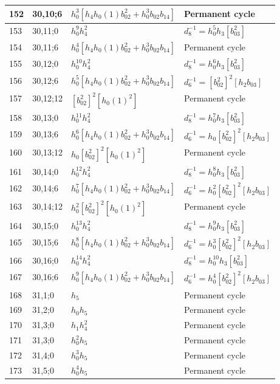 \documentclass{article}
\begin{document}
\begin{longtable}{|l|l|>{\raggedright\arraybackslash}p{6cm}|>{\raggedright\arraybackslash}p{6cm}|}
\hline
152 & 30,10;6 & $h_0^3[h_4h_0(1)b_{02}^2 + h_0^3b_{02}b_{14}]$ & Permanent cycle\\
\hline
153 & 30,11;0 & $h_0^9h_4^2$ & $d_{8}^{-1}=h_0^5h_3[b_{03}^2]$\\
\hline
154 & 30,11;6 & $h_0^4[h_4h_0(1)b_{02}^2 + h_0^3b_{02}b_{14}]$ & Permanent cycle\\
\hline
155 & 30,12;0 & $h_0^{10}h_4^2$ & $d_{8}^{-1}=h_0^6h_3[b_{03}^2]$\\
\hline
156 & 30,12;6 & $h_0^5[h_4h_0(1)b_{02}^2 + h_0^3b_{02}b_{14}]$ & $d_{6}^{-1}=[b_{02}^2]^2[h_2b_{03}]$\\
\hline
157 & 30,12;12 & $[b_{02}^2]^2[h_0(1)^2]$ & Permanent cycle\\
\hline
158 & 30,13;0 & $h_0^{11}h_4^2$ & $d_{8}^{-1}=h_0^7h_3[b_{03}^2]$\\
\hline
159 & 30,13;6 & $h_0^6[h_4h_0(1)b_{02}^2 + h_0^3b_{02}b_{14}]$ & $d_{6}^{-1}=h_0[b_{02}^2]^2[h_2b_{03}]$\\
\hline
160 & 30,13;12 & $h_0[b_{02}^2]^2[h_0(1)^2]$ & Permanent cycle\\
\hline
161 & 30,14;0 & $h_0^{12}h_4^2$ & $d_{8}^{-1}=h_0^8h_3[b_{03}^2]$\\
\hline
162 & 30,14;6 & $h_0^7[h_4h_0(1)b_{02}^2 + h_0^3b_{02}b_{14}]$ & $d_{6}^{-1}=h_0^2[b_{02}^2]^2[h_2b_{03}]$\\
\hline
163 & 30,14;12 & $h_0^2[b_{02}^2]^2[h_0(1)^2]$ & Permanent cycle\\
\hline
164 & 30,15;0 & $h_0^{13}h_4^2$ & $d_{8}^{-1}=h_0^9h_3[b_{03}^2]$\\
\hline
165 & 30,15;6 & $h_0^8[h_4h_0(1)b_{02}^2 + h_0^3b_{02}b_{14}]$ & $d_{6}^{-1}=h_0^3[b_{02}^2]^2[h_2b_{03}]$\\
\hline
166 & 30,16;0 & $h_0^{14}h_4^2$ & $d_{8}^{-1}=h_0^{10}h_3[b_{03}^2]$\\
\hline
167 & 30,16;6 & $h_0^9[h_4h_0(1)b_{02}^2 + h_0^3b_{02}b_{14}]$ & $d_{6}^{-1}=h_0^4[b_{02}^2]^2[h_2b_{03}]$\\
\hline
168 & 31,1;0 & $h_5$ & Permanent cycle\\
\hline
169 & 31,2;0 & $h_0h_5$ & Permanent cycle\\
\hline
170 & 31,3;0 & $h_1h_4^2$ & Permanent cycle\\
171 & 31,3;0 & $h_0^2h_5$ & Permanent cycle\\
\hline
172 & 31,4;0 & $h_0^3h_5$ & Permanent cycle\\
\hline
173 & 31,5;0 & $h_0^4h_5$ & Permanent cycle\\

\end{longtable}
\end{document}
